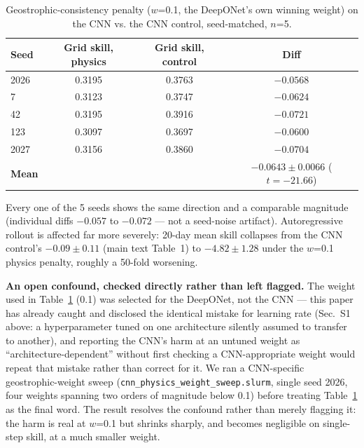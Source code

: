 \documentclass[11pt]{article}
\begin{document}
\begin{table}[h]
\centering
\caption{Geostrophic-consistency penalty ($w$=0.1, the DeepONet's own winning weight) on the CNN vs. the CNN control, seed-matched, $n$=5.}
\label{tab:supp_physics_cnn}
\begin{tabular}{lccc}
\toprule
Seed & Grid skill, physics & Grid skill, control & Diff \\
\midrule
2026 & 0.3195 & 0.3763 & $-0.0568$ \\
7    & 0.3123 & 0.3747 & $-0.0624$ \\
42   & 0.3195 & 0.3916 & $-0.0721$ \\
123  & 0.3097 & 0.3697 & $-0.0600$ \\
2027 & 0.3156 & 0.3860 & $-0.0704$ \\
\midrule
\textbf{Mean} & & & $\mathbf{-0.0643 \pm 0.0066}$ ($t=-21.66$) \\
\bottomrule
\end{tabular}
\end{table}

Every one of the 5 seeds shows the same direction and a comparable magnitude (individual diffs $-0.057$ to $-0.072$ --- not a seed-noise artifact). Autoregressive rollout is affected far more severely: 20-day mean skill collapses from the CNN control's $-0.09 \pm 0.11$ (main text Table~1) to \textbf{$-4.82 \pm 1.28$} under the $w$=0.1 physics penalty, roughly a 50-fold worsening.

\textbf{An open confound, checked directly rather than left flagged.} The weight used in Table~\ref{tab:supp_physics_cnn} (0.1) was selected for the DeepONet, not the CNN --- this paper has already caught and disclosed the identical mistake for learning rate (Sec.~S1 above: a hyperparameter tuned on one architecture silently assumed to transfer to another), and reporting the CNN's harm at an untuned weight as ``architecture-dependent'' without first checking a CNN-appropriate weight would repeat that mistake rather than correct for it. We ran a CNN-specific geostrophic-weight sweep (\texttt{cnn\_physics\_weight\_sweep.slurm}, single seed 2026, four weights spanning two orders of magnitude below 0.1) before treating Table~\ref{tab:supp_physics_cnn} as the final word. The result resolves the confound rather than merely flagging it: the harm is real at $w$=0.1 but shrinks sharply, and becomes negligible on single-step skill, at a much smaller weight.
\end{document}
